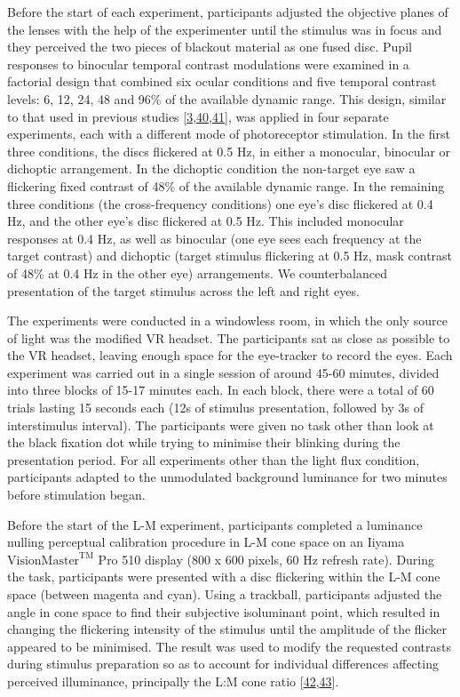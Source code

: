\documentclass[
]{article}
\begin{document}
Before the start of each experiment, participants adjusted the objective planes of the lenses with the help of the experimenter until the stimulus was in focus and they perceived the two pieces of blackout material as one fused disc. Pupil responses to binocular temporal contrast modulations were examined in a factorial design that combined six ocular conditions and five temporal contrast levels: 6, 12, 24, 48 and 96\% of the available dynamic range. This design, similar to that used in previous studies {[}\protect\hyperlink{ref-Segala2023}{3},\protect\hyperlink{ref-Baker2017}{40},\protect\hyperlink{ref-Baker2020}{41}{]}, was applied in four separate experiments, each with a different mode of photoreceptor stimulation. In the first three conditions, the discs flickered at 0.5 Hz, in either a monocular, binocular or dichoptic arrangement. In the dichoptic condition the non-target eye saw a flickering fixed contrast of 48\% of the available dynamic range. In the remaining three conditions (the cross-frequency conditions) one eye's disc flickered at 0.4 Hz, and the other eye's disc flickered at 0.5 Hz. This included monocular responses at 0.4 Hz, as well as binocular (one eye sees each frequency at the target contrast) and dichoptic (target stimulus flickering at 0.5 Hz, mask contrast of 48\% at 0.4 Hz in the other eye) arrangements. We counterbalanced presentation of the target stimulus across the left and right eyes.

The experiments were conducted in a windowless room, in which the only source of light was the modified VR headset. The participants sat as close as possible to the VR headset, leaving enough space for the eye-tracker to record the eyes. Each experiment was carried out in a single session of around 45-60 minutes, divided into three blocks of 15-17 minutes each. In each block, there were a total of 60 trials lasting 15 seconds each (12s of stimulus presentation, followed by 3s of interstimulus interval). The participants were given no task other than look at the black fixation dot while trying to minimise their blinking during the presentation period. For all experiments other than the light flux condition, participants adapted to the unmodulated background luminance for two minutes before stimulation began.

Before the start of the L-M experiment, participants completed a luminance nulling perceptual calibration procedure in L-M cone space on an Iiyama \(\textrm{VisionMaster}^{\textrm{TM}}\) Pro 510 display (800 x 600 pixels, 60 Hz refresh rate). During the task, participants were presented with a disc flickering within the L-M cone space (between magenta and cyan). Using a trackball, participants adjusted the angle in cone space to find their subjective isoluminant point, which resulted in changing the flickering intensity of the stimulus until the amplitude of the flicker appeared to be minimised. The result was used to modify the requested contrasts during stimulus preparation so as to account for individual differences affecting perceived illuminance, principally the L:M cone ratio {[}\protect\hyperlink{ref-Carroll2002}{42},\protect\hyperlink{ref-Hofer2005}{43}{]}.
\end{document}
